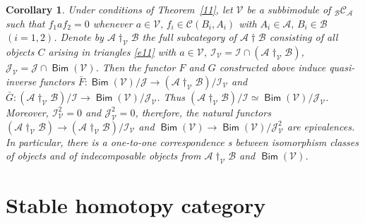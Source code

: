 \documentclass[12pt,a4paper]{amsart}
\newtheorem{corol}[theorem]{Corollary}
\theoremstyle{definition}
\theoremstyle{remark}
\numberwithin{equation}{section}
\begin{document}
  \begin{corol}\label{12}
  Under conditions of Theorem~\ref{11}, let ${\mathscr V}$ be a subbimodule of ${{_{\mathscr B}}{\mathscr C}_{\mathscr A}}$ such that
 $f_1af_2=0$ whenever $a\in{\mathscr V},\,f_i\in{\mathscr C}(B_i,A_i)$ with $A_i\in{\mathscr A},\,B_i\in{\mathscr B}$
 $(i=1,2)$. Denote by ${\mathscr A}{\dagger}_{\mathscr V}{\mathscr B}$ the full subcategory of ${\mathscr A}{\dagger}{\mathscr B}$ consisting
 of all objects $C$ arising in triangles \eqref{e11} with $a\in{\mathscr V}$,
 ${\mathscr I}_{\mathscr V}={\mathscr I}\cap({\mathscr A}{\dagger}_{\mathscr V}{\mathscr B})$, ${\mathscr J}_{\mathscr V}={\mathscr J}\cap{\mathop\mathsf{Bim}\nolimits}({\mathscr V})$. Then the functor
 $F$ and $G$ constructed above induce quasi-inverse functors 
 $\bar F:{\mathop\mathsf{Bim}\nolimits}({\mathscr V})/{\mathscr J}\to({\mathscr A}{\dagger}_{\mathscr V}{\mathscr B})/{\mathscr I}_{\mathscr V}$ and
 $\bar G:({\mathscr A}{\dagger}_{\mathscr V}{\mathscr B})/{\mathscr I}\to{\mathop\mathsf{Bim}\nolimits}({\mathscr V})/{\mathscr J}_{\mathscr V}$.
 Thus $({\mathscr A}{\dagger}_{\mathscr V}{\mathscr B})/{\mathscr I}\simeq{\mathop\mathsf{Bim}\nolimits}({\mathscr V})/{\mathscr J}_{\mathscr V}$. Moreover, ${\mathscr I}_{\mathscr V}^2=0$
 and ${\mathscr J}_{\mathscr V}^2=0$, therefore, the natural functors $({\mathscr A}{\dagger}_{\mathscr V}{\mathscr B})\to({\mathscr A}{\dagger}_{\mathscr V}{\mathscr B})/{\mathscr I}_{\mathscr V}$
 and ${\mathop\mathsf{Bim}\nolimits}({\mathscr V})\to{\mathop\mathsf{Bim}\nolimits}({\mathscr V})/{\mathscr J}^2_{\mathscr V}$ are epivalences. In particular, there is a {one-to-one correspondence} s 
 between isomorphism classes of objects and of indecomposable objects from ${\mathscr A}{\dagger}_{\mathscr V}{\mathscr B}$ and ${\mathop\mathsf{Bim}\nolimits}({\mathscr V})$.
 \end{corol}

 \section{Stable homotopy category}
 \label{s2}
\end{document}
